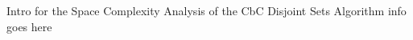 \documentclass[../../ClusteringConnectionsMAIN.tex]{subfiles}
\begin{document}
\begin{flushleft}
\begin{large}

Intro for the Space Complexity Analysis of the CbC Disjoint Sets Algorithm info goes here


\end{large}
\end{flushleft}
\end{document}
